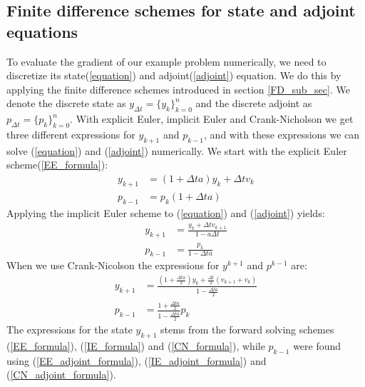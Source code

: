 \subsection{Finite difference schemes for state and adjoint equations}
To evaluate the gradient of our example problem numerically, we need to discretize its state(\ref{equation}) and adjoint(\ref{adjoint}) equation. We do this by applying the finite difference schemes introduced in section \ref{FD_sub_sec}. We denote the discrete state as $y_{\Delta t}=\{y_k\}_{k=0}^{n}$ and the discrete adjoint as $p_{\Delta t}=\{p_k\}_{k=0}^{n}$. With explicit Euler, implicit Euler and Crank-Nicholson we get three different expressions for $y_{k+1}$ and $p_{k-1}$, and with these expressions we can solve (\ref{equation}) and (\ref{adjoint}) numerically. We start with the explicit Euler scheme(\ref{EE_formula}):
\begin{align}
y_{k+1}&=(1 +\Delta ta) y_{k} + \Delta t v_{k}\label{E_state} \\
p_{k-1} &=p_k(1 +\Delta ta)\label{E_adjoint}
\end{align}
Applying the implicit Euler scheme to (\ref{equation}) and (\ref{adjoint}) yields:
\begin{align}
y_{k+1} &=\frac{y_{k} +\Delta t v_{k+1}}{1-a\Delta t} \label{I_state} \\
p_{k-1} &= \frac{p_k}{1-\Delta ta} \label{I_adjoint}
\end{align}
When we use Crank-Nicolson the expressions for $y^{k+1}$ and $p^{k-1}$ are:
\begin{align}
y_{k+1} &= \frac{(1+\frac{\Delta ta}{2})y_k +\frac{\Delta t}{2}(v_{k+1}+v_{k})}{1-\frac{\Delta t a}{2}}\label{CN_FD_state} \\
p_{k-1} &= \frac{1+\frac{\Delta ta}{2}}{1-\frac{\Delta t a}{2}}p_k\label{CN_FD_adjoint}
\end{align}
The expressions for the state $y_{k+1}$ stems from the forward solving schemes (\ref{EE_formula}), (\ref{IE_formula}) and (\ref{CN_formula}), while $p_{k-1}$ were found using (\ref{EE_adjoint_formula}), (\ref{IE_adjoint_formula}) and (\ref{CN_adjoint_formula}).
